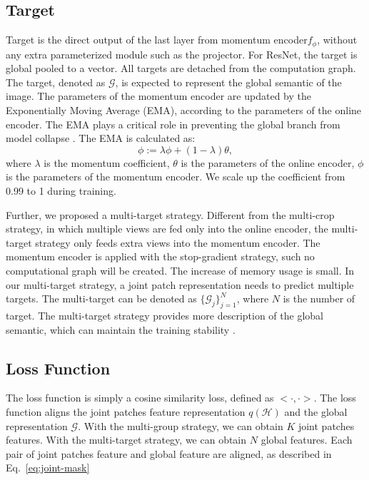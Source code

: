 \documentclass[10pt,twocolumn,letterpaper]{article}
\begin{document}
\subsection{Target}
Target is the direct output of the last layer from momentum encoder$f_\phi$, without any extra parameterized module such as the projector. For ResNet, the target is global pooled to a vector. All targets are detached from the computation graph. The target, denoted as $\mathcal{G}$, is expected to represent the global semantic of the image. 
The parameters of the momentum encoder are updated by the Exponentially Moving Average (EMA), according to the parameters of the online encoder. The EMA plays a critical role in preventing the global branch from model collapse \cite{he2020momentum,grill2020bootstrap}. The EMA is calculated as:
\begin{equation}
    \phi := \lambda\phi + (1 - \lambda)\theta,
\end{equation}
where $\lambda$ is the momentum coefficient, $\theta$ is the parameters of the online encoder, $\phi$ is the parameters of the momentum encoder. We scale up the coefficient from 0.99 to 1 during training. 

Further, we proposed a multi-target strategy. Different from the multi-crop strategy, in which multiple views are fed only into the online encoder, the multi-target strategy only feeds extra views into the momentum encoder. The momentum encoder is applied with the stop-gradient strategy, such no computational graph will be created. The increase of memory usage is small. In our multi-target strategy, a joint patch representation needs to predict multiple targets. The multi-target can be denoted as $\{ \mathcal{G}_j \}_{j=1}^{N}$, where $N$ is the number of target. The multi-target strategy provides more description of the global semantic, which can maintain the training stability .

\subsection{Loss Function}
The loss function is simply a cosine similarity loss, defined as $<\cdot, \cdot>$. The loss function aligns the joint patches feature representation $q(\mathcal{H})$ and the global representation $\mathcal{G}$. With the multi-group strategy, we can obtain $K$ joint patches features. With the multi-target strategy, we can obtain $N$ global features. Each pair of joint patches feature and global feature are aligned, as described in Eq.~\ref{eq:joint-mask}
\end{document}
